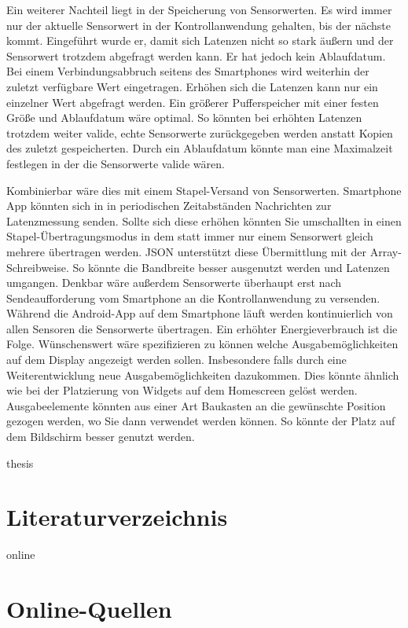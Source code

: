 \documentclass[11pt,a4paper]{report}
\begin{document}
Ein weiterer Nachteil liegt in der Speicherung von Sensorwerten.
Es wird immer nur der aktuelle Sensorwert in der Kontrollanwendung gehalten, bis der nächste kommt.
Eingeführt wurde er, damit sich Latenzen nicht so stark äußern und der Sensorwert trotzdem abgefragt werden kann.
Er hat jedoch kein Ablaufdatum.
Bei einem Verbindungsabbruch seitens des Smartphones wird weiterhin der zuletzt verfügbare Wert eingetragen.
Erhöhen sich die Latenzen kann nur ein einzelner Wert abgefragt werden.
Ein größerer Pufferspeicher mit einer festen Größe und Ablaufdatum wäre optimal.
So könnten bei erhöhten Latenzen trotzdem weiter valide, echte Sensorwerte zurückgegeben werden anstatt Kopien des zuletzt gespeicherten.
Durch ein Ablaufdatum könnte man eine Maximalzeit festlegen in der die Sensorwerte valide wären.

Kombinierbar wäre dies mit einem Stapel-Versand von Sensorwerten.
Smartphone App könnten sich in in periodischen Zeitabständen Nachrichten zur Latenzmessung senden.
Sollte sich diese erhöhen könnten Sie umschallten in einen Stapel-Übertragungsmodus in dem statt immer nur einem Sensorwert gleich mehrere übertragen werden.
JSON unterstützt diese Übermittlung mit der Array-Schreibweise.
So könnte die Bandbreite besser ausgenutzt werden und Latenzen umgangen.
Denkbar wäre außerdem Sensorwerte überhaupt erst nach Sendeaufforderung vom Smartphone an die Kontrollanwendung zu versenden.
Während die Android-App auf dem Smartphone läuft werden kontinuierlich von allen Sensoren die Sensorwerte übertragen.
Ein erhöhter Energieverbrauch ist die Folge.
Wünschenswert wäre spezifizieren zu können welche Ausgabemöglichkeiten auf dem Display angezeigt werden sollen.
Insbesondere falls durch eine Weiterentwicklung neue Ausgabemöglichkeiten dazukommen.
Dies könnte ähnlich wie bei der Platzierung von Widgets auf dem Homescreen gelöst werden.
Ausgabeelemente könnten aus einer Art Baukasten an die gewünschte Position gezogen werden, wo Sie dann verwendet werden können.
So könnte der Platz auf dem Bildschirm besser genutzt werden.

\newpage

\begin{btSect}{thesis} %
\section*{Literaturverzeichnis}
\btPrintCited
\end{btSect}
\begin{btSect}{online}
\section*{Online-Quellen}
\btPrintCited
%
\end{btSect}
\end{document}
